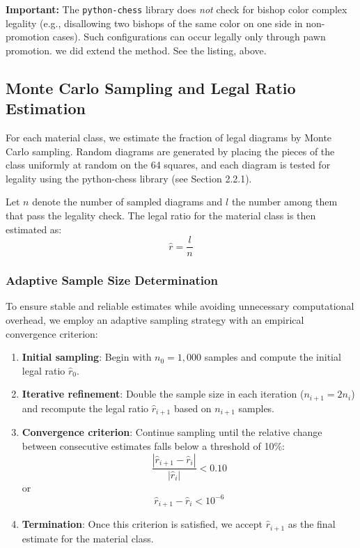 \documentclass[12pt]{article}
\begin{document}
\noindent
\textbf{Important:} The \texttt{python-chess} library does \emph{not} check for bishop color complex legality 
(e.g., disallowing two bishops of the same color on one side in non-promotion cases). 
Such configurations can occur legally only through pawn promotion. 
we did extend the method. See the listing, above.

\subsection{Monte Carlo Sampling and Legal Ratio Estimation}

For each material class, we estimate the fraction of legal diagrams by Monte Carlo sampling. Random diagrams are generated by placing the pieces of the class uniformly at random on the 64 squares, and each diagram is tested for legality using the python-chess library (see Section 2.2.1).

Let $n$ denote the number of sampled diagrams and $l$ the number among them that pass the legality check. The legal ratio for the material class is then estimated as:
\begin{equation}
\hat{r} = \frac{l}{n}
\end{equation}

\subsubsection{Adaptive Sample Size Determination}

To ensure stable and reliable estimates while avoiding unnecessary computational overhead, we employ an adaptive sampling strategy with an empirical convergence criterion:

\begin{enumerate}
\item \textbf{Initial sampling}: Begin with $n_0 = 1{,}000$ samples and compute the initial legal ratio $\hat{r}_0$.

\item \textbf{Iterative refinement}: Double the sample size in each iteration ($n_{i+1} = 2n_i$) and recompute the legal ratio $\hat{r}_{i+1}$ based on $n_{i+1}$ samples.

\item \textbf{Convergence criterion}: Continue sampling until the relative change between consecutive estimates falls below a threshold of 10\%:
\begin{equation}
\frac{|\hat{r}_{i+1} - \hat{r}_i|}{|\hat{r}_i|} < 0.10
\end{equation}
or 
\begin{equation}
\hat{r}_{i+1} - \hat{r}_i< 10^{-6}
\end{equation}

\item \textbf{Termination}: Once this criterion is satisfied, we accept $\hat{r}_{i+1}$ as the final estimate for the material class.
\end{enumerate}
\end{document}
